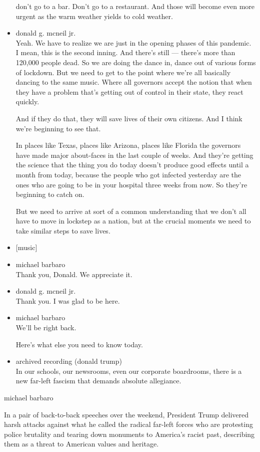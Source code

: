 \begin{itemize}
  don't go to a bar. Don't go to a restaurant. And those will become
  even more urgent as the warm weather yields to cold weather.
\item
  donald g. mcneil jr.\\
  Yeah. We have to realize we are just in the opening phases of this
  pandemic. I mean, this is the second inning. And there's still ---
  there's more than 120,000 people dead. So we are doing the dance in,
  dance out of various forms of lockdown. But we need to get to the
  point where we're all basically dancing to the same music. Where all
  governors accept the notion that when they have a problem that's
  getting out of control in their state, they react quickly.

  And if they do that, they will save lives of their own citizens. And I
  think we're beginning to see that.

  In places like Texas, places like Arizona, places like Florida the
  governors have made major about-faces in the last couple of weeks. And
  they're getting the science that the thing you do today doesn't
  produce good effects until a month from today, because the people who
  got infected yesterday are the ones who are going to be in your
  hospital three weeks from now. So they're beginning to catch on.

  But we need to arrive at sort of a common understanding that we don't
  all have to move in lockstep as a nation, but at the crucial moments
  we need to take similar steps to save lives.
\item
  {[}music{]}
\item
  michael barbaro\\
  Thank you, Donald. We appreciate it.
\item
  donald g. mcneil jr.\\
  Thank you. I was glad to be here.
\item
  michael barbaro\\
  We'll be right back.

  Here's what else you need to know today.
\item
  archived recording (donald trump)\\
  In our schools, our newsrooms, even our corporate boardrooms, there is
  a new far-left fascism that demands absolute allegiance.
\end{itemize}

michael barbaro

In a pair of back-to-back speeches over the weekend, President Trump
delivered harsh attacks against what he called the radical far-left
forces who are protesting police brutality and tearing down monuments to
America's racist past, describing them as a threat to American values
and heritage.

